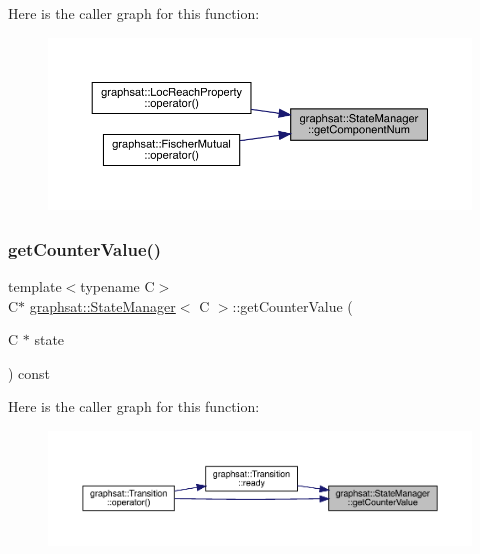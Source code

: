 Here is the caller graph for this function\+:
\nopagebreak
\begin{figure}[H]
\begin{center}
\leavevmode
\includegraphics[width=350pt]{classgraphsat_1_1_state_manager_abdc84b2d02bfc0fb7532cbf28456ac8f_icgraph}
\end{center}
\end{figure}
\mbox{\label{classgraphsat_1_1_state_manager_af81f3d34cb182be513c13e48012ceece}} 
\subsubsection{\texorpdfstring{getCounterValue()}{getCounterValue()}\hspace{0.1cm}{\footnotesize\ttfamily [1/2]}}
{\footnotesize\ttfamily template$<$typename C$>$ \\
C$\ast$ \mbox{\hyperlink{classgraphsat_1_1_state_manager}{graphsat\+::\+State\+Manager}}$<$ C $>$\+::get\+Counter\+Value (\begin{DoxyParamCaption}\item[{C $\ast$}]{state }\end{DoxyParamCaption}) const\hspace{0.3cm}{\ttfamily [inline]}}

Here is the caller graph for this function\+:
\nopagebreak
\begin{figure}[H]
\begin{center}
\leavevmode
\includegraphics[width=350pt]{classgraphsat_1_1_state_manager_af81f3d34cb182be513c13e48012ceece_icgraph}
\end{center}
\end{figure}
\mbox{\label{classgraphsat_1_1_state_manager_ad406b27a7a26c7da1b4dec6286d21d9d}} 
